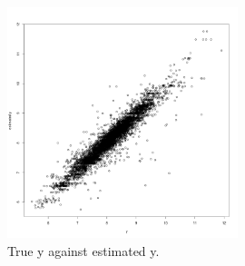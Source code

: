 \documentclass[11pt]{article}
\begin{document}
\begin{figure}[h]
    \centering
    \includegraphics[width=0.6\textwidth]{Ex5/figures/esty.png}
    \caption{True y against estimated y.}
    \label{fig:hist_betai}
\end{figure}
\end{document}
